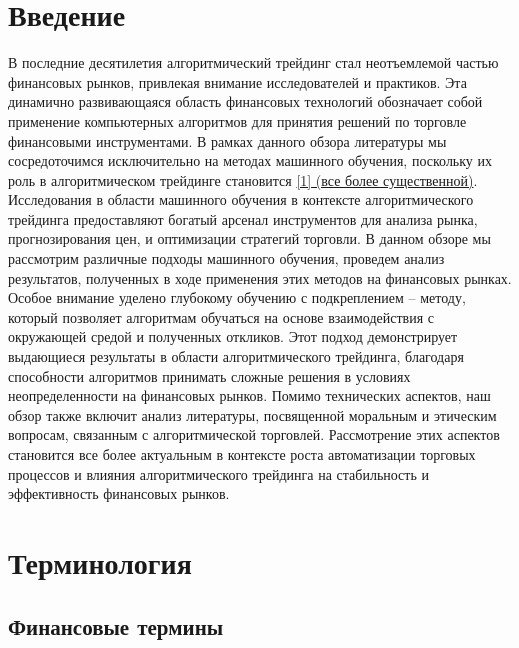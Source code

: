 \documentclass[a4paper,14pt]{extarticle}
\newcommand{\bibref}[3]{\hyperlink{#1}{#2 (#3)}} %
\begin{document}
\section{Введение} 
В последние десятилетия алгоритмический трейдинг стал неотъемлемой частью финансовых рынков, привлекая внимание исследователей и практиков. Эта динамично развивающаяся область финансовых технологий обозначает собой применение компьютерных алгоритмов для принятия решений по торговле финансовыми инструментами. В рамках данного обзора литературы мы сосредоточимся исключительно на методах машинного обучения, поскольку их роль в алгоритмическом трейдинге становится \bibref{1}{[1]}{все более существенной}.
Исследования в области машинного обучения в контексте алгоритмического трейдинга предоставляют богатый арсенал инструментов для анализа рынка, прогнозирования цен, и оптимизации стратегий торговли. В данном обзоре мы рассмотрим различные подходы машинного обучения, проведем анализ результатов, полученных в ходе применения этих методов на финансовых рынках.
Особое внимание уделено глубокому обучению с подкреплением – методу, который позволяет алгоритмам обучаться на основе взаимодействия с окружающей средой и полученных откликов. Этот подход демонстрирует выдающиеся результаты в области алгоритмического трейдинга, благодаря способности алгоритмов принимать сложные решения в условиях неопределенности на финансовых рынков.
Помимо технических аспектов, наш обзор также включит анализ литературы, посвященной моральным и этическим вопросам, связанным с алгоритмической торговлей. Рассмотрение этих аспектов становится все более актуальным в контексте роста автоматизации торговых процессов и влияния алгоритмического трейдинга на стабильность и эффективность финансовых рынков. 


\newpage

\newpage
\section{Терминология} 
\subsection{Финансовые термины}
\end{document}
